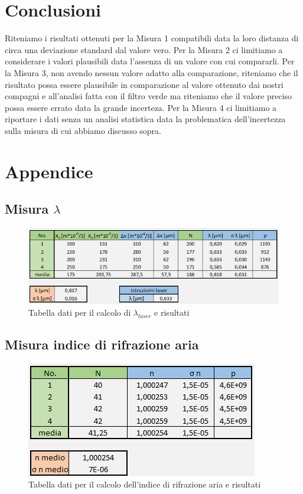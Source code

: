 \documentclass{article}
\begin{document}
\section{Conclusioni}
Riteniamo i risultati ottenuti per la Misura 1 compatibili data la loro distanza di circa una deviazione standard dal valore vero. Per la Misura 2 ci limitiamo a considerare i valori plausibili data l'assenza di un valore con cui compararli. Per la Misura 3, non avendo nessun valore adatto alla comparazione, riteniamo che il risultato possa essere plausibile in comparazione al valore ottenuto dai nostri compagni e all'analisi fatta con il filtro verde ma riteniamo che il valore preciso possa essere errato data la grande incerteza. Per la Misura 4 ci limitiamo a riportare i dati senza un analisi statistica data la problematica dell'incertezza sulla misura di cui abbiamo discusso sopra.


\clearpage

\section{Appendice}
\subsection{Misura $\lambda$}

\begin{figure}[h!]
  \centering
  \includegraphics[width=1\linewidth]{IM tabella lambda}
  \caption{Tabella dati per il calcolo di $\lambda_{laser}$ e risultati}
\end{figure}


\subsection{Misura indice di rifrazione aria}


\begin{figure}[h!]
  \centering
  \includegraphics[width=0.6\linewidth]{IM tabella n}
  \caption{Tabella dati per il calcolo dell'indice di rifrazione aria e risultati}
\end{figure}
\end{document}
